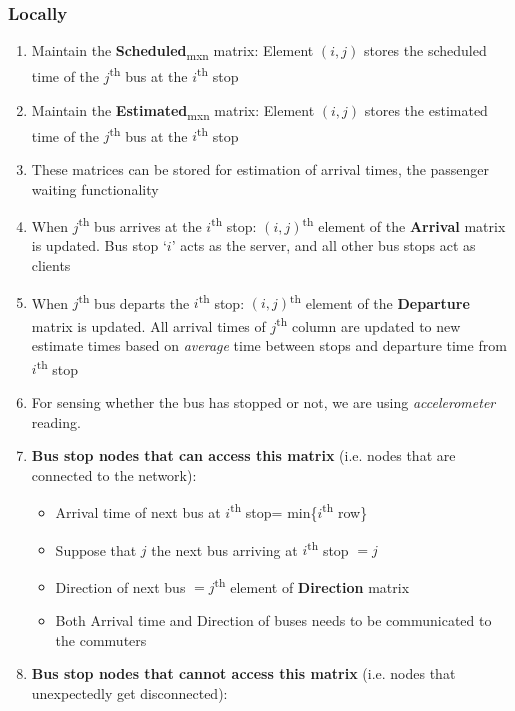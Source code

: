 \subsubsection{Locally}

\begin{enumerate}

    \item Maintain the \textbf{Scheduled}\textsubscript{mxn} matrix: Element $(i, j)$ stores the scheduled time of the $j$\textsuperscript{th} bus at the $i$\textsuperscript{th} stop
    \item Maintain the \textbf{Estimated}\textsubscript{mxn} matrix: Element $(i, j)$ stores the estimated time of the $j$\textsuperscript{th} bus at the $i$\textsuperscript{th} stop
    \item These matrices can be stored for estimation of arrival times, the passenger waiting functionality
    \item When $j$\textsuperscript{th} bus arrives at the $i$\textsuperscript{th} stop: $(i, j)$\textsuperscript{th} element of the \textbf{Arrival} matrix is updated. Bus stop `$i$' acts as the server, and all other bus stops act as clients
    \item When $j$\textsuperscript{th} bus departs the $i$\textsuperscript{th} stop: $(i, j)$\textsuperscript{th} element of the \textbf{Departure} matrix is updated. All arrival times of $j$\textsuperscript{th} column are updated to new estimate times based on \textit{average} time between stops and departure time from $i$\textsuperscript{th} stop
    \item For sensing whether the bus has stopped or not, we are using \textit{\gls{accelerometer}} reading.
    \item \textbf{Bus stop nodes that can access this matrix} (i.e. nodes that are connected to the network):
          \begin{itemize}
              \item Arrival time of next bus at $i$\textsuperscript{th} stop= min\{$i$\textsuperscript{th} row\}
              \item Suppose that $j$ the next bus arriving at $i$\textsuperscript{th} stop $= j$
              \item Direction of next bus $= j$\textsuperscript{th} element of \textbf{Direction} matrix
              \item Both Arrival time and Direction of buses needs to be communicated to the commuters
          \end{itemize}
    \item \textbf{Bus stop nodes that cannot access this matrix} (i.e. nodes that unexpectedly get disconnected):

\end{enumerate}
